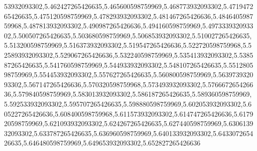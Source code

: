 53932093302,5.462427265426635,5.465600598759969,5.468773932093302,5.471947265426635,5.475120598759969,5.478293932093302,5.481467265426636,5.484640598759968,5.487813932093302,5.490987265426636,5.494160598759969,5.497333932093302,5.500507265426635,5.503680598759969,5.506853932093302,5.510027265426635,5.513200598759969,5.516373932093302,5.519547265426636,5.522720598759968,5.525893932093302,5.529067265426636,5.532240598759969,5.535413932093302,5.538587265426635,5.541760598759969,5.544933932093302,5.548107265426635,5.551280598759969,5.554453932093302,5.557627265426635,5.560800598759969,5.563973932093302,5.567147265426636,5.570320598759968,5.573493932093302,5.576667265426636,5.579840598759969,5.583013932093302,5.586187265426635,5.589360598759969,5.592533932093302,5.595707265426635,5.598880598759969,5.602053932093302,5.605227265426636,5.608400598759968,5.611573932093302,5.614747265426636,5.617920598759969,5.621093932093302,5.624267265426635,5.627440598759969,5.630613932093302,5.633787265426635,5.636960598759969,5.640133932093302,5.643307265426635,5.646480598759969,5.649653932093302,5.652827265426636

